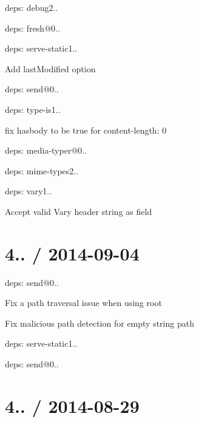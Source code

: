 {\begin{DoxyItemize}
\begin{DoxyItemize}
\item deps\+: debug2..
\item deps\+: fresh@0..
\end{DoxyItemize}
\item deps\+: serve-\/static1..
\begin{DoxyItemize}
\item Add {\ttfamily last\+Modified} option
\item deps\+: send@0..
\end{DoxyItemize}
\item deps\+: type-\/is1..
\begin{DoxyItemize}
\item fix {\ttfamily hasbody} to be true for {\ttfamily content-\/length\+: 0}
\item deps\+: media-\/typer@0..
\item deps\+: mime-\/types2..
\end{DoxyItemize}
\item deps\+: vary1..
\begin{DoxyItemize}
\item Accept valid {\ttfamily Vary} header string as {\ttfamily field}
\end{DoxyItemize}
\end{DoxyItemize}}

{\ttfamily \section*{4.. / 2014-\/09-\/04 }}

{\ttfamily }

{\ttfamily 
\begin{DoxyItemize}
\item deps\+: send@0..
\begin{DoxyItemize}
\item Fix a path traversal issue when using {\ttfamily root}
\item Fix malicious path detection for empty string path
\end{DoxyItemize}
\item deps\+: serve-\/static1..
\begin{DoxyItemize}
\item deps\+: send@0..
\end{DoxyItemize}
\end{DoxyItemize}}

{\ttfamily \section*{4.. / 2014-\/08-\/29 }}


